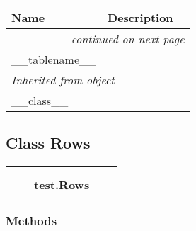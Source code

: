     \vspace{-1cm}
\hspace{\varindent}\begin{longtable}{|p{\varnamewidth}|p{\vardescrwidth}|l}
\cline{1-2}
\cline{1-2} \centering \textbf{Name} & \centering \textbf{Description}& \\
\cline{1-2}
\endhead\cline{1-2}\multicolumn{3}{r}{\small\textit{continued on next page}}\\\endfoot\cline{1-2}
\endlastfoot\raggedright \_\-\_\-t\-a\-b\-l\-e\-n\-a\-m\-e\-\_\-\_\- & &\\
\cline{1-2}
\multicolumn{2}{|l|}{\textit{Inherited from object}}\\
\multicolumn{2}{|p{\varwidth}|}{\raggedright \_\_class\_\_}\\
\cline{1-2}
\end{longtable}



\subsection{Class Rows}

    \label{test:Rows}
\begin{tabular}{cccccc}
\multicolumn{2}{r}{\settowidth{\BCL}{object}\multirow{2}{\BCL}{object}}
&&
  \\\cline{3-3}
  &&\multicolumn{1}{c|}{}
&&
  \\
&&\multicolumn{2}{l}{\textbf{test.Rows}}
\end{tabular}



  \subsubsection{Methods}

    \vspace{0.5ex}

